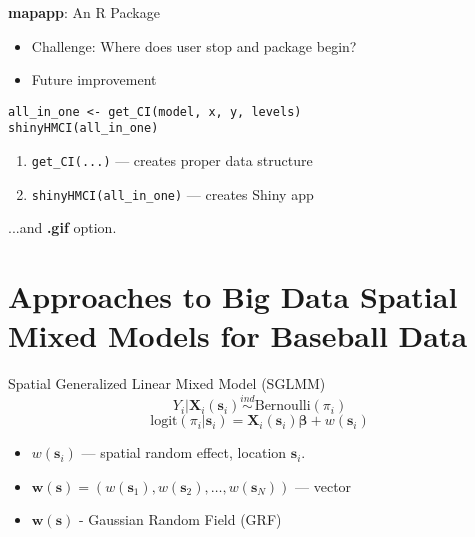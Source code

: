 \documentclass{beamer}
\begin{document}
\begin{frame}[fragile]{{\bf mapapp}: An R Package}
\begin{itemize}
\addtolength{\itemsep}{0.5\baselineskip}
\item Challenge: Where does user stop and package begin?
\item Future improvement
\end{itemize}

\begin{verbatim}
all_in_one <- get_CI(model, x, y, levels)
shinyHMCI(all_in_one)
\end{verbatim}

\begin{enumerate}
\addtolength{\itemsep}{0.5\baselineskip}
\item \verb|get_CI(...)| --- creates proper data structure 
\item \verb|shinyHMCI(all_in_one)| --- creates Shiny app
\end{enumerate}
...and {\bf .gif} option.

\end{frame}

\section{Approaches to Big Data Spatial Mixed Models for Baseball Data}

\begin{frame}{Spatial Generalized Linear Mixed Model (SGLMM)}{}
$$ Y_{i}|\mathbf{X}_{i}(\mathbf{s}_{i}) \stackrel{ind}{\sim} \mbox{Bernoulli}(\pi_{i}) $$
$$\text{logit}(\pi_{i}|\pmb{s}_{i}) = \mathbf{X}_{i}(\mathbf{s}_{i})\pmb{\beta} + w(\pmb{s}_{i}) $$
\begin{itemize}
\addtolength{\itemsep}{0.5\baselineskip}
\item $w(\pmb{s}_{i})$ --- spatial random effect, location $\pmb{s}_{i}$.
\item $\pmb{w}(\pmb{s}) = (w(\pmb{s}_{1}), w(\pmb{s}_{2}), \dots, w(\pmb{s}_{N}))$ --- vector
\item $\pmb{w}(\pmb{s})$ - Gaussian Random Field (GRF)
\end{itemize}

\end{frame}
\end{document}
